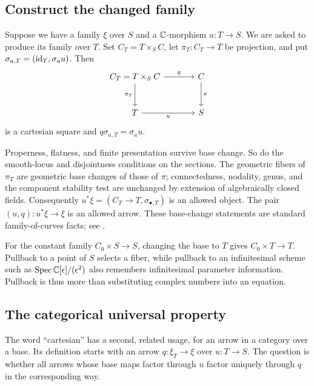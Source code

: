 \subsection{Construct the changed family}

Suppose we have a family $\xi$ over $S$ and a $\mathbb C$-morphism
$u:T\to S$. We are asked to produce its family over $T$.
Set $C_T=T\times_SC$, let $\pi_T:C_T\to T$ be projection, and
put $\sigma_{a,T}=(\operatorname{id}_T,\sigma_a u)$. Then
\[
\begin{tikzcd}[row sep=large,column sep=large]
C_T=T\times_SC\arrow[r,"q"]\arrow[d,"\pi_T"']&C\arrow[d,"\pi"]\\
T\arrow[r,"u"']&S
\end{tikzcd}
\]
is a cartesian square and $q\sigma_{a,T}=\sigma_a u$.

Properness, flatness, and finite presentation survive base change.
So do the smooth-locus and disjointness conditions on the sections.
The geometric fibers of $\pi_T$ are geometric base changes of those
of $\pi$; connectedness, nodality, genus, and the component stability
test are unchanged by extension of algebraically closed fields.
Consequently $u^*\xi=(C_T\to T,\sigma_{\bullet,T})$ is an allowed
object. The pair $(u,q):u^*\xi\to\xi$ is an allowed arrow.
These base-change statements are standard family-of-curves facts;
see \cite[Section 6.3.4, pp.~231--232]{Alper}.

\begin{Ex}
For the constant family $C_0\times S\to S$, changing the base to
$T$ gives $C_0\times T\to T$. Pullback to a point of $S$ selects
a fiber, while pullback to an infinitesimal scheme such as
$\operatorname{Spec}\mathbb C[\epsilon]/(\epsilon^2)$ also remembers infinitesimal
parameter information. Pullback is thus more than substituting
complex numbers into an equation.
\end{Ex}

\subsection{The categorical universal property}

The word ``cartesian'' has a second, related usage, for an arrow
in a category over a base. Its definition starts with an arrow
$q:\xi_T\to\xi$ over $u:T\to S$. The question is whether all
arrows whose base maps factor through $u$ factor uniquely through
$q$ in the corresponding way.

